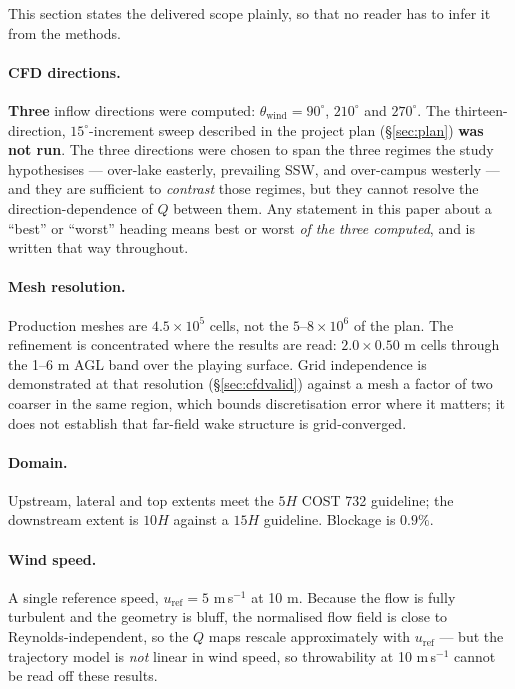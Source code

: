 \documentclass[11pt,letterpaper]{article}
\begin{document}
This section states the delivered scope plainly, so that no reader has to infer
it from the methods.

\paragraph{CFD directions.} \textbf{Three} inflow directions were computed:
$\theta_{\text{wind}} = 90^\circ$, $210^\circ$ and $270^\circ$. The
thirteen-direction, $15^\circ$-increment sweep described in the project plan
(\S\ref{sec:plan}) \textbf{was not run}. The three directions were chosen to
span the three regimes the study hypothesises --- over-lake easterly,
prevailing SSW, and over-campus westerly --- and they are sufficient to
\emph{contrast} those regimes, but they cannot resolve the direction-dependence
of $Q$ between them. Any statement in this paper about a ``best'' or ``worst''
heading means best or worst \emph{of the three computed}, and is written that
way throughout.

\paragraph{Mesh resolution.} Production meshes are $4.5 \times 10^{5}$ cells,
not the $5$--$8 \times 10^{6}$ of the plan. The refinement is concentrated where
the results are read: $2.0 \times 0.50$ m cells through the 1--6 m AGL band over
the playing surface. Grid independence is demonstrated at that resolution
(\S\ref{sec:cfdvalid}) against a mesh a factor of two coarser in the same
region, which bounds discretisation error where it matters; it does not
establish that far-field wake structure is grid-converged.

\paragraph{Domain.} Upstream, lateral and top extents meet the $5H$ COST 732
guideline; the downstream extent is $10H$ against a $15H$ guideline. Blockage is
$0.9\%$.

\paragraph{Wind speed.} A single reference speed,
$u_{\text{ref}} = 5$ m\,s$^{-1}$ at 10 m. Because the flow is fully turbulent
and the geometry is bluff, the normalised flow field is close to
Reynolds-independent, so the $Q$ maps rescale approximately with
$u_{\text{ref}}$ --- but the trajectory model is \emph{not} linear in wind
speed, so throwability at 10 m\,s$^{-1}$ cannot be read off these results.
\end{document}
